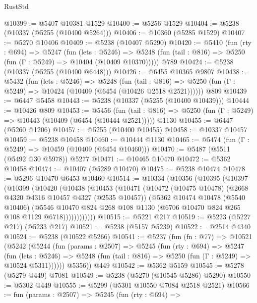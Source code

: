 \begin{lexlean}{RustStd}
\begin{coremodule}
@10399 := @5407 @10381 @1529
@10400 := @5256 @1529
@10404 := @5238 (@10337 (@5255 (@10400 @5264)))
@10406 := @10360 (@5285 @1529)
@10407 := @5270 @10406
@10409 := @5238 (@10407 @5290)
@10420 := @5410
    (fun (rty : @694) =>
    @5247
      (fun (lets : @5246) =>
      @5248 (fun (tail : @816) => @5250 (fun (Γ : @5249) => @10404 (@10409 @10370)))))
    @789
@10424 := @5238 (@10337 (@5255 (@10400 @6448)))
@10426 := @6455 @10365 @9807
@10438 := @5432
    (fun (lets : @5246) =>
    @5248
      (fun (tail : @816) =>
      @5250 (fun (Γ : @5249) => @10424 (@10409 (@6454 (@10426 @2518 @2521))))))
    @809
@10439 := @6447 @5458
@10443 := @5238 (@10337 (@5255 (@10400 @10439)))
@10444 := @10426 @809
@10453 := @5456
    (fun (tail : @816) => @5250 (fun (Γ : @5249) => @10443 (@10409 (@6454 (@10444 @2521)))))
    @1130
@10455 := @6447 (@5260 @1206)
@10457 := @5255 (@10400 @10455)
@10458 := @10337 @10457
@10459 := @5238 @10458
@10460 := @10444 @1130
@10465 := @5474 (fun (Γ : @5249) => @10459 (@10409 (@6454 @10460)))
@10470 := @5487 (@5511 (@5492 @30 @5978)) @5277
@10471 := @10465 @10470
@10472 := @5362 @10458
@10474 := @10407 (@5289 @10470)
@10475 := @5238 @10474
@10478 := @5296 @10470 @6453 @10460
@10514 := @10334
    (@10356
      (@10395
        (@10397
          (@10399
            (@10420
              (@10438
                (@10453
                  (@10471
                    (@10472
                      (@10475 @10478)
                      (@2668 @4320 @4316 @10457 @4327 (@2535 @10457))
                      (@5362
                        @10474
                        @10478
                        (@5540 @10406)
                        (@5546
                          @10470
                          @824
                          @268
                          @108
                          @1130
                          (@6706 @10470 @824 @265 @108 @1129 @6718))))))))))))
@10515 := @5221 @217
@10519 := @5223 (@5227 @217) (@5233 @217)
@10521 := @5238 (@5157 @5239)
@10522 := @2514 @4340
@10524 := @5238 (@10522 @5266)
@10541 := @5237
    (fun (fn : @77) =>
    @10521
      (@5242
        (@5244
          (fun (params : @2507) =>
          @5245
            (fun (rty : @694) =>
            @5247
              (fun (lets : @5246) =>
              @5248 (fun (tail : @816) => @5250 (fun (Γ : @5249) => @10524 @5311))))))
        @5356))
    @449
@10542 := @5362 @5159
@10545 := @5278 (@5279 @449) @7081
@10549 := @5238 (@5270 (@10545 @5286) @5290)
@10550 := @5302 @449
@10555 := @5299 (@5301 @10550 @7084 @2518 @2521)
@10566 := fun (params : @2507) =>
  @5245
    (fun (rty : @694) =>

\end{coremodule}
\end{lexlean}
